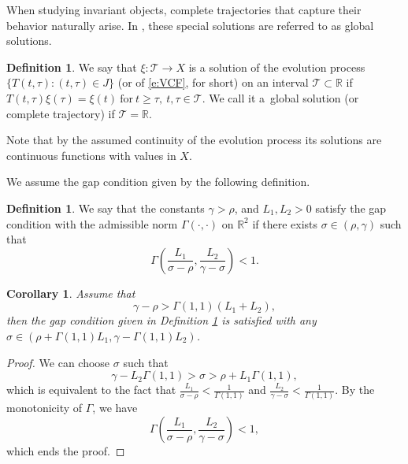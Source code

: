 \documentclass[a4paper,11pt,reqno]{amsart}
\theoremstyle{plain}
\newtheorem{cor}[lem]{Corollary}
\theoremstyle{definition}
\newtheorem{defn}[lem]{Definition}
\numberwithin{equation}{section}
\newcommand{\R}{\mathbb{R}}
\newcommand{\calt}{\mathcal T}
\renewcommand{\geq}{\geqslant}
\begin{document}
When studying invariant objects, complete trajectories that capture their behavior naturally arise. In \cite{CLR}, these special solutions are referred to as global solutions.

\begin{defn}
We say that $\xi\colon\calt\to X$ is a solution of the evolution process $\{T(t,\tau)\colon (t,\tau)\in J\}$ (or of \eqref{e:VCF}, for short) on an interval $\calt\subset\R$ if 
$T(t,\tau)\xi(\tau)=\xi(t)\ \text{for}\ t\geq \tau,\ t,\tau\in\calt.$
We call it a~global solution (or complete trajectory) if $\calt=\R$.
\end{defn}
Note that by the assumed continuity of the evolution process its solutions are continuous functions with values in $X$.




We assume the gap condition given by the following definition.
\begin{defn}\label{def:gap}
	We say that the constants $\gamma>\rho$, and $L_1,L_2>0$ satisfy the gap condition with the admissible norm $\Gamma(\cdot,\cdot)$ on $\R^2$ if there exists $\sigma\in (\rho,\gamma)$ such that 
		\begin{equation}\label{e:GAPGENERAL00}
	\Gamma\left(\frac{L_1}{\sigma-\rho},\frac{L_2}{\gamma-\sigma}\right)<1.
	\end{equation}
\end{defn} 



\begin{cor}
Assume that
\begin{equation}\label{e:GAPGENERAL0}
\gamma-\rho > \Gamma(1,1)(L_1+L_2),
\end{equation}
then the gap condition given in Definition \ref{def:gap} is satisfied with any $\sigma\in(\rho+\Gamma(1,1)L_1,\gamma-\Gamma(1,1)L_2)$.
\end{cor}

\begin{proof}
We can choose $\sigma$ such that 
$$\gamma-L_2\Gamma(1,1)>\sigma>\rho+L_1\Gamma(1,1),$$
which is equivalent to the fact that $\frac{L_1}{\sigma-\rho}<\frac{1}{\Gamma(1,1)}$ and $\frac{L_2}{\gamma-\sigma}<\frac{1}{\Gamma(1,1)}$. By the monotonicity of $\Gamma$, we have
$$\Gamma\left(\frac{L_1}{\sigma-\rho},\frac{L_2}{\gamma-\sigma}\right)<1,$$
which ends the proof. 
\end{proof}
\end{document}
